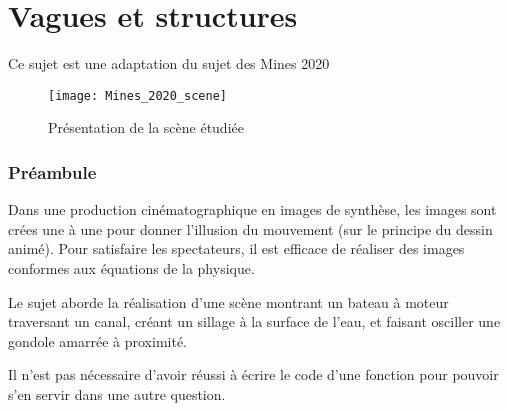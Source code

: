 \chapter{Vagues et structures}

Ce sujet est une adaptation du sujet des Mines 2020
\begin{figure}[ht]
\begin{center}
\texttt{[image: Mines\_2020\_scene]}
\caption{Présentation de la scène étudiée}
\end{center}
\end{figure}
\newpage
\subsection*{Préambule} 
Dans une production cinématographique en images de synthèse, les images sont crées une à une pour
donner l’illusion du mouvement (sur le principe du dessin animé). Pour satisfaire les spectateurs,
il est efficace de réaliser des images conformes aux équations de la physique.

Le sujet aborde la réalisation d’une scène montrant un bateau à moteur traversant un canal, créant
un sillage à la surface de l’eau, et faisant osciller une gondole amarrée à proximité. 

Il n’est pas nécessaire d’avoir réussi à écrire le code d’une fonction pour pouvoir s’en servir dans une autre question.

\medskip

